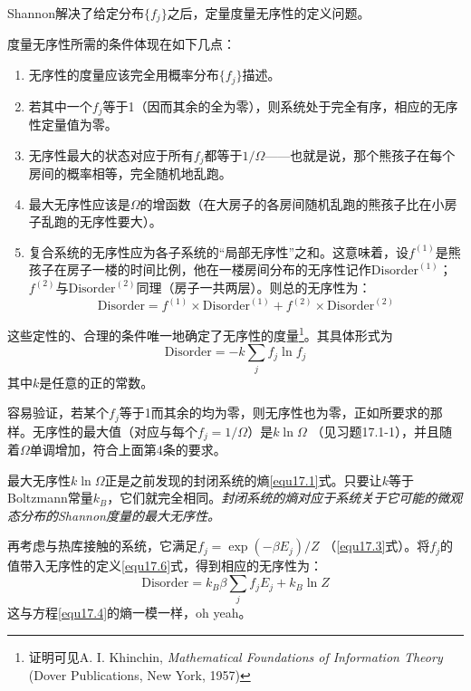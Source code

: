 Shannon解决了给定分布$\{ f_j \}$之后，定量度量无序性的定义问题。

度量无序性所需的条件体现在如下几点：
\begin{enumerate}
	\item 无序性的度量应该完全用概率分布$\{ f_j \}$描述。
	\item 若其中一个$f_j$等于1（因而其余的全为零），则系统处于完全有序，相应的无序性定量值为零。
	\item 无序性最大的状态对应于所有$f_j$都等于$1 / \Omega$——也就是说，那个熊孩子在每个房间的概率相等，完全随机地乱跑。
	\item 最大无序性应该是$\Omega$的增函数（在大房子的各房间随机乱跑的熊孩子比在小房子乱跑的无序性要大）。
	\item 复合系统的无序性应为各子系统的“局部无序性”之和。这意味着，设$f^{(1)}$是熊孩子在房子一楼的时间比例，他在一楼房间分布的无序性记作$\text{Disorder}^{(1)}$；$f^{(2)}$与$\text{Disorder}^{(2)}$同理（房子一共两层）。则总的无序性为：
	\begin{equation}
		\text{Disorder} = f^{(1)} \times \text{Disorder}^{(1)} + f^{(2)} \times \text{Disorder}^{(2)}
	\label{equ17.5}
	\end{equation}
\end{enumerate}
这些定性的、合理的条件唯一地确定了无序性的度量\footnote{证明可见A. I. Khinchin, {\it Mathematical Foundations of Information Theory} (Dover Publications, New York, 1957)}。其具体形式为
\begin{equation}
	\text{Disorder} = -k \sum_j f_j \ln f_j
\label{equ17.6}
\end{equation}
其中$k$是任意的正的常数。

容易验证，若某个$f_j$等于1而其余的均为零，则无序性也为零，正如所要求的那样。无序性的最大值（对应与每个$f_j = 1 / \Omega$）是$k \ln \Omega$ （见习题17.1-1），并且随着$\Omega$单调增加，符合上面第4条的要求。

最大无序性$k \ln \Omega$正是之前发现的封闭系统的熵\eqref{equ17.1}式。只要让$k$等于Boltzmann常量$k_B$，它们就完全相同。{\it 封闭系统的熵对应于系统关于它可能的微观态分布的Shannon度量的最大无序性。}

再考虑与热库接触的系统，它满足$f_j = \exp (-\beta E_j) / Z$ （\eqref{equ17.3}式）。将$f_j$的值带入无序性的定义\eqref{equ17.6}式，得到相应的无序性为：
\begin{equation}
	\text{Disorder} = k_B \beta \sum_j f_j E_j + k_B \ln Z
\label{equ17.7}
\end{equation}
这与方程\eqref{equ17.4}的熵一模一样，oh yeah。


